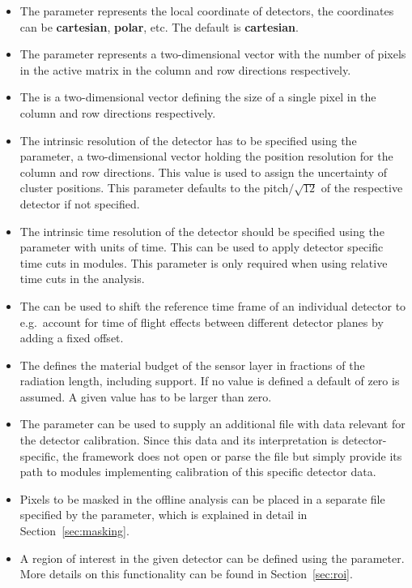 \begin{itemize}
\item The  parameter represents the local coordinate of detectors, the coordinates can be \textbf{cartesian}, \textbf{polar}, etc. The default  is \textbf{cartesian}.

\item The  parameter represents a two-dimensional vector with the number of pixels in the active matrix in the column and row directions respectively.
\item The  is a two-dimensional vector defining the size of a single pixel in the column and row directions respectively.
\item The intrinsic resolution of the detector has to be specified using the  parameter, a two-dimensional vector holding the position resolution for the column and row directions. This value is used to assign the uncertainty of cluster positions. This parameter defaults to the pitch$/\sqrt{12}$ of the respective detector if not specified.
\item The intrinsic time resolution of the detector should be specified using the  parameter with units of time. This can be used to apply detector specific time cuts in modules. This parameter is only required when using relative time cuts in the analysis.
\item The  can be used to shift the reference time frame of an individual detector to e.g.\ account for time of flight effects between different detector planes by adding a fixed offset.
\item The  defines the material budget of the sensor layer in fractions of the radiation length, including support. If no value is defined a default of zero is assumed. A given value has to be larger than zero.
\item The  parameter can be used to supply an additional file with data relevant for the detector calibration. Since this data and its interpretation is detector-specific, the framework does not open or parse the file but simply provide its path to modules implementing calibration of this specific detector data.
\item Pixels to be masked in the offline analysis can be placed in a separate file specified by the  parameter, which is explained in detail in Section~\ref{sec:masking}.
\item A region of interest in the given detector can be defined using the  parameter. More details on this functionality can be found in Section~\ref{sec:roi}.
\end{itemize}

